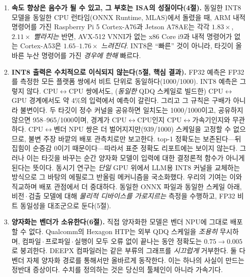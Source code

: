 \documentclass[11pt]{article}
\begin{document}
\begin{enumerate}
\item \textbf{속도 향상은 음수가 될 수 있고, 그 부호는 ISA의 성질이다(4절).} 동일한 INT8 모델을 동일한 CPU 런타임(ONNX Runtime, MLAS)에서 돌렸을 때, ARM 내적 명령어를 가진 Raspberry Pi 5 Cortex-A76과 Jetson A78AE는 각각 $1.83\times$, $2.11\times$ \emph{빨라지는} 반면, AVX-512 VNNI가 없는 x86 Core i9과 내적 명령어가 없는 Cortex-A53은 $1.65$--$1.76\times$ \emph{느려진다}. INT8은 ``빠른'' 것이 아니라, 타깃이 올바른 누산 명령어를 가진 \emph{경우에 한해} 빠르다.

\item \textbf{INT8 출력은 수치적으로 이식되지 않는다(5절, 핵심 결과).} FP32 예측은 FP32를 측정한 모든 플랫폼 쌍에서 비트 단위로 동일하다(1000/1000). INT8 예측은 그렇지 않다. CPU$\leftrightarrow$CPU 쌍에서도, (\emph{동일한} QDQ 스케일로 빌드한) CPU$\leftrightarrow$GPU 경계에서도 약 4\%의 입력에서 예측이 갈린다. 그리고 그 규칙은 구배가 아니라 불변이다. 두 타깃이 정수 커널을 공유하면 일치도는 1000/1000이고, 공유하지 않으면 958--965/1000이며, 경계가 CPU$\leftrightarrow$CPU인지 CPU$\leftrightarrow$가속기인지와 무관하다. CPU$\leftrightarrow$벤더 NPU 쌍은 더 벌어지지만(939/1000) 스케일을 고정할 수 없으므로, 불변 주장 바깥의 배포 관측치로만 보고한다. top-1 정확도는 보존된다---뒤집힘이 순증감 0이기 때문이다---따라서 표준 정확도 리포트에는 보이지 않는다. 그러나 이는 타깃을 바꾸는 순간 양자화 모델이 입력에 대한 결정론적 함수가 아니게 된다는 뜻이다. 동시기 연구는 \emph{단일} GPU 위에서 LLM용 INT8 커널을 교체하는 방식으로 그 바탕의 에필로그 반올림 메커니즘을 국소화했다\citep{chen2026integeralibi}. 우리의 기여는 이와 직교하며 배포 관점에서 더 중대하다. 동일한 ONNX 파일과 동일한 스케일 아래, 비전\,$\cdot$\,검출 모델에 대해 \emph{물리적 디바이스를 가로지르는} 측정을 수행하고, FP32 비트 동일성을 대조군으로 둔다(5절).

\item \textbf{양자화는 벤더가 소유한다(6절).} 직접 양자화한 모델은 벤더 NPU에 그대로 배포할 수 없다. Qualcomm의 Hexagon HTP는 외부 QDQ 스케일을 \emph{조용히} 무시하며, 컴파일\,$\cdot$\,프로파일\,$\cdot$\,실행이 모두 오류 없이 끝나는 동안 정확도는 $0.75 \rightarrow 0.005$로 붕괴한다. DEEPX 컴파일러는 같은 부류의 그래프를 \emph{시끄럽게} 거부한다. 둘 다 벤더 자체 양자화 경로를 통해서만 올바르게 동작한다. 이는 하나의 사실이 만드는 정반대 증상이다. 수치를 정의하는 것은 당신의 툴체인이 아니라 가속기다.
\end{enumerate}
\end{document}
